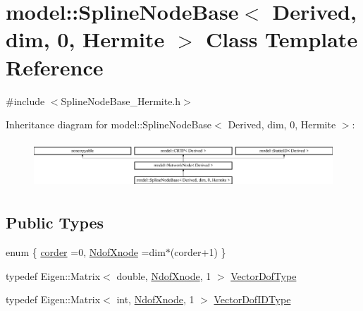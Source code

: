 \hypertarget{classmodel_1_1_spline_node_base_3_01_derived_00_01dim_00_010_00_01_hermite_01_4}{}\section{model\+:\+:Spline\+Node\+Base$<$ Derived, dim, 0, Hermite $>$ Class Template Reference}
\label{classmodel_1_1_spline_node_base_3_01_derived_00_01dim_00_010_00_01_hermite_01_4}


{\ttfamily \#include $<$Spline\+Node\+Base\+\_\+\+Hermite.\+h$>$}

Inheritance diagram for model\+:\+:Spline\+Node\+Base$<$ Derived, dim, 0, Hermite $>$\+:\begin{figure}[H]
\begin{center}
\leavevmode
\includegraphics[height=1.766562cm]{classmodel_1_1_spline_node_base_3_01_derived_00_01dim_00_010_00_01_hermite_01_4}
\end{center}
\end{figure}
\subsection*{Public Types}
\begin{DoxyCompactItemize}
\item 
enum \{ \hyperlink{classmodel_1_1_spline_node_base_3_01_derived_00_01dim_00_010_00_01_hermite_01_4_afaf4fc31fc13ff494ad8d2996b9c3e3da967d9c81f765bf8dfe783e941f61e244}{corder} =0, 
\hyperlink{classmodel_1_1_spline_node_base_3_01_derived_00_01dim_00_010_00_01_hermite_01_4_afaf4fc31fc13ff494ad8d2996b9c3e3da59cc73e3e1ef579f4674f90a5307915f}{Ndof\+Xnode} =dim$\ast$(corder+1)
 \}
\item 
typedef Eigen\+::\+Matrix$<$ double, \hyperlink{classmodel_1_1_spline_node_base_3_01_derived_00_01dim_00_010_00_01_hermite_01_4_afaf4fc31fc13ff494ad8d2996b9c3e3da59cc73e3e1ef579f4674f90a5307915f}{Ndof\+Xnode}, 1 $>$ \hyperlink{classmodel_1_1_spline_node_base_3_01_derived_00_01dim_00_010_00_01_hermite_01_4_a80bc9eddf53243e072ed19e68412d939}{Vector\+Dof\+Type}
\item 
typedef Eigen\+::\+Matrix$<$ int, \hyperlink{classmodel_1_1_spline_node_base_3_01_derived_00_01dim_00_010_00_01_hermite_01_4_afaf4fc31fc13ff494ad8d2996b9c3e3da59cc73e3e1ef579f4674f90a5307915f}{Ndof\+Xnode}, 1 $>$ \hyperlink{classmodel_1_1_spline_node_base_3_01_derived_00_01dim_00_010_00_01_hermite_01_4_af7807f7969fece6222d6376110a1c904}{Vector\+Dof\+I\+D\+Type}
\end{DoxyCompactItemize}
